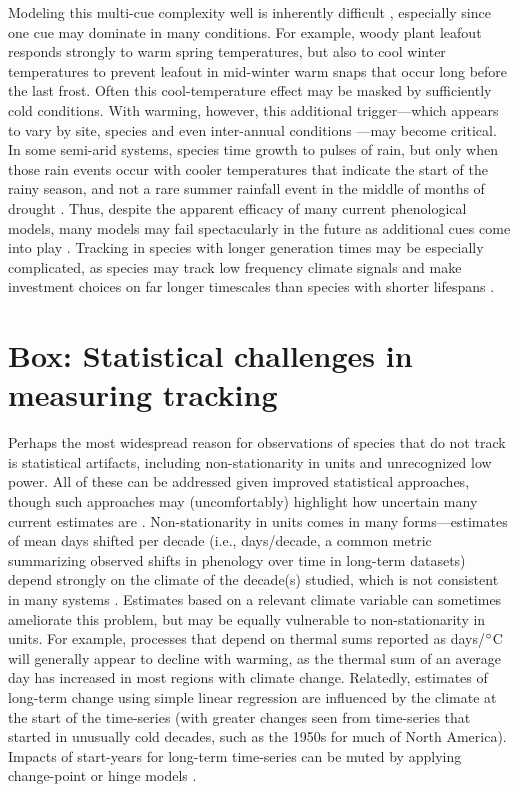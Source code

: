 \documentclass[11pt,letterpaper]{article}
\begin{document}
Modeling this multi-cue complexity well is inherently difficult \citep{chuine2016}, especially since one cue may dominate in many conditions. For example, woody plant leafout responds strongly to warm spring temperatures, but also to cool winter temperatures to prevent leafout in mid-winter warm snaps that occur long before the last frost. Often this cool-temperature effect may be masked by sufficiently cold conditions. With warming, however, this additional trigger---which appears to vary by site, species and even inter-annual conditions \citep{dennis2003}---may become critical. In some semi-arid systems, species time growth to pulses of rain, but only when those rain events occur with cooler temperatures that indicate the start of the rainy season, and not a rare summer rainfall event in the middle of months of drought \citep{Wainwright:2012tw,wainwright2013}. Thus, despite the apparent efficacy of many current phenological models, many models may fail spectacularly in the future as additional cues come into play \citep{chuine2016}. Tracking in species with longer generation times may be especially complicated, as species may track low frequency climate signals and make investment choices on far longer timescales than species with shorter lifespans \citep{morris2008}. 

\section{Box: Statistical challenges in measuring tracking}
Perhaps the most widespread reason for observations of species that do not track is statistical artifacts, including non-stationarity in units and unrecognized low power. All of these can be addressed given improved statistical approaches, though such approaches may (uncomfortably) highlight how uncertain many current estimates are \citep{brown2016}. Non-stationarity in units comes in many forms---estimates of mean days shifted per decade (i.e., days/decade, a common metric summarizing observed shifts in phenology over time in long-term datasets) depend strongly on the climate of the decade(s) studied, which is not consistent in many systems \citep{Ault2011,McCabe2012}. Estimates based on a relevant climate variable can sometimes ameliorate this problem, but may be equally vulnerable to non-stationarity in units. For example, processes that depend on thermal sums reported as days/$\degree$C will generally appear to decline with warming, as the thermal sum of an average day has increased in most regions with climate change. Relatedly, estimates of long-term change using simple linear regression are influenced by the climate at the start of the time-series (with greater changes seen from time-series that started in unusually cold decades, such as the 1950s for much of North America). Impacts of start-years for long-term time-series can be muted by applying change-point or hinge models \citep[e.g.,][]{kharouba2018}. 
\end{document}
